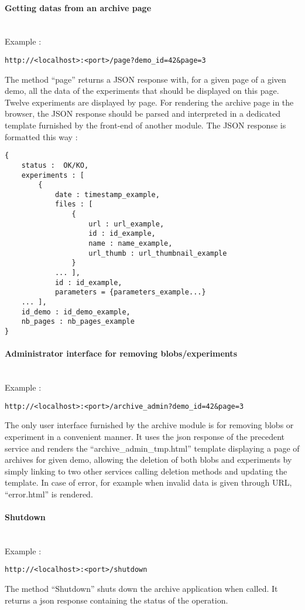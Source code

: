 \paragraph{Getting datas from an archive page} \hspace{0pt} \\
Example :
\begin{verbatim}
http://<localhost>:<port>/page?demo_id=42&page=3
\end{verbatim}
The method ``page'' returns a JSON response with, for a given page of a given demo, all the data of the experiments that should be displayed on this page. Twelve experiments are displayed by page. For rendering the archive page in the browser, the JSON response should be parsed and interpreted in a dedicated template furnished by the front-end of another module. The JSON response is formatted this way : 
\begin{verbatim}
{
    status :  OK/KO,
    experiments : [
        {
            date : timestamp_example, 
            files : [
                {
                    url : url_example,
                    id : id_example,
                    name : name_example,
                    url_thumb : url_thumbnail_example
                }
            ... ],
            id : id_example,
            parameters = {parameters_example...}
    ... ],
    id_demo : id_demo_example,
    nb_pages : nb_pages_example
}
\end{verbatim} 

\paragraph{Administrator interface for removing blobs/experiments} \hspace{0pt} \\
Example :
\begin{verbatim}
http://<localhost>:<port>/archive_admin?demo_id=42&page=3
\end{verbatim}
The only user interface furnished by the archive module is for removing blobs or experiment in a convenient manner. It uses the json response of the precedent service and renders the ``archive\_admin\_tmp.html'' template displaying a page of archives for given demo, allowing the deletion of both blobs and experiments by simply linking to two other services calling deletion methods and updating the template. In case of error, for example when invalid data is given through URL, ``error.html'' is rendered.

\paragraph{Shutdown} \hspace{0pt} \\
Example :
\begin{verbatim}
http://<localhost>:<port>/shutdown
\end{verbatim}
The method ``Shutdown'' shuts down the archive application when called. It returns a json response containing the status of the operation.

